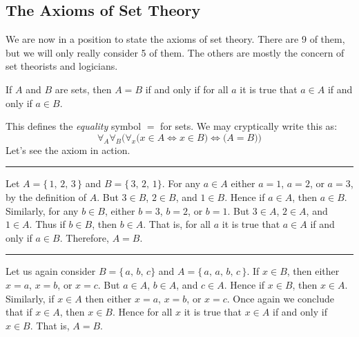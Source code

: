         \subsection{The Axioms of Set Theory}
            We are now in a position to state the axioms of set theory. There
            are 9 of them, but we will only really consider 5 of them. The
            others are mostly the concern of set theorists and logicians.
            \begin{axiom}
                If $A$ and $B$ are sets, then $A=B$ if and only if for all
                $a$ it is true that $a\in{A}$ if and only if $a\in{B}$.
            \end{axiom}
            This defines the \textit{equality} symbol $=$ for sets. We may
            cryptically write this as:
            \begin{equation}
                \forall_{A}\forall_{B}\Big(
                    \forall_{x}\big(x\in{A}\Leftrightarrow{x}\in{B}\big)
                        \Leftrightarrow\big(A=B)\Big)
            \end{equation}
            Let's see the axiom in action.
            \par\hfill\par\hrule
            \begin{example}
                Let $A=\{\,1,\,2,\,3\,\}$ and $B=\{\,3,\,2,\,1\}$. For any
                $a\in{A}$ either $a=1$, $a=2$, or $a=3$, by the definition of
                $A$. But $3\in{B}$, $2\in{B}$, and $1\in{B}$. Hence if
                $a\in{A}$, then $a\in{B}$. Similarly, for any $b\in{B}$,
                either $b=3$, $b=2$, or $b=1$. But $3\in{A}$, $2\in{A}$,
                and $1\in{A}$. Thus if $b\in{B}$, then $b\in{A}$. That is, for
                all $a$ it is true that $a\in{A}$ if and only if $a\in{B}$.
                Therefore, $A=B$.
            \end{example}
            \hrule
            \begin{example}
                Let us again consider $B=\{\,a,\,b,\,c\}$ and
                $A=\{\,a,\,a,\,b,\,c\,\}$. If $x\in{B}$, then either
                $x=a$, $x=b$, or $x=c$. But $a\in{A}$, $b\in{A}$, and $c\in{A}$.
                Hence if $x\in{B}$, then $x\in{A}$. Similarly, if $x\in{A}$ then
                either $x=a$, $x=b$, or $x=c$. Once again we conclude that if
                $x\in{A}$, then $x\in{B}$. Hence for all $x$ it is true that
                $x\in{A}$ if and only if $x\in{B}$. That is, $A=B$.
            \end{example}

